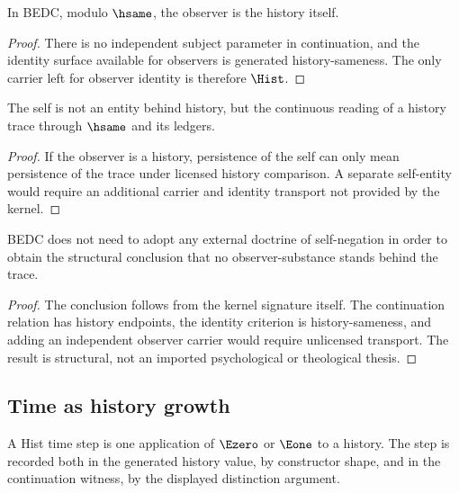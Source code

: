 \begin{corollary}
\label{cor:philosophy-observer-is-history}
In BEDC, modulo \(\hsame\), the observer is the history itself.
\end{corollary}
\begin{proof}
There is no independent subject parameter in continuation, and the
identity surface available for observers is generated history-sameness.
The only carrier left for observer identity is therefore \(\Hist\).
\end{proof}

\begin{corollary}
\label{cor:philosophy-self-trace-reading}
The self is not an entity behind history, but the continuous reading of
a history trace through \(\hsame\) and its ledgers.
\end{corollary}
\begin{proof}
If the observer is a history, persistence of the self can only mean
persistence of the trace under licensed history comparison. A separate
self-entity would require an additional carrier and identity transport
not provided by the kernel.
\end{proof}

\begin{corollary}
\label{cor:philosophy-no-substance-behind-trace}
BEDC does not need to adopt any external doctrine of self-negation in
order to obtain the structural conclusion that no observer-substance
stands behind the trace.
\end{corollary}
\begin{proof}
The conclusion follows from the kernel signature itself. The
continuation relation has history endpoints, the identity criterion is
history-sameness, and adding an independent observer carrier would
require unlicensed transport. The result is structural, not an imported
psychological or theological thesis.
\end{proof}

\subsection{Time as history growth}
\label{subsec:philosophy-time-history-growth}

\begin{definition}
\label{def:philosophy-hist-time-step}
A Hist time step is one application of \(\Ezero\) or \(\Eone\) to a
history. The step is recorded both in the generated history value, by
constructor shape, and in the continuation witness, by the displayed
distinction argument.
\end{definition}

